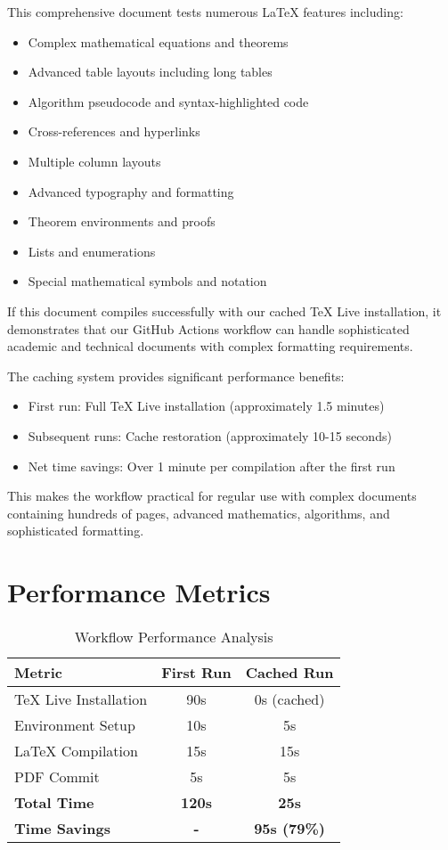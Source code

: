 \documentclass[12pt,a4paper,twoside]{article}
\theoremstyle{definition}
\begin{document}
This comprehensive document tests numerous LaTeX features including:
\begin{itemize}
\item Complex mathematical equations and theorems
\item Advanced table layouts including long tables
\item Algorithm pseudocode and syntax-highlighted code
\item Cross-references and hyperlinks
\item Multiple column layouts
\item Advanced typography and formatting
\item Theorem environments and proofs
\item Lists and enumerations
\item Special mathematical symbols and notation
\end{itemize}

If this document compiles successfully with our cached TeX Live installation, it demonstrates that our GitHub Actions workflow can handle sophisticated academic and technical documents with complex formatting requirements.

The caching system provides significant performance benefits:
\begin{itemize}
\item First run: Full TeX Live installation (approximately 1.5 minutes)
\item Subsequent runs: Cache restoration (approximately 10-15 seconds)
\item Net time savings: Over 1 minute per compilation after the first run
\end{itemize}

This makes the workflow practical for regular use with complex documents containing hundreds of pages, advanced mathematics, algorithms, and sophisticated formatting.

\appendix

\section{Performance Metrics}

\begin{table}[H]
\centering
\caption{Workflow Performance Analysis}
\begin{tabular}{@{}lcc@{}}
\toprule
\textbf{Metric} & \textbf{First Run} & \textbf{Cached Run} \\
\midrule
TeX Live Installation & 90s & 0s (cached) \\
Environment Setup & 10s & 5s \\
LaTeX Compilation & 15s & 15s \\
PDF Commit & 5s & 5s \\
\textbf{Total Time} & \textbf{120s} & \textbf{25s} \\
\textbf{Time Savings} & \textbf{-} & \textbf{95s (79\%)} \\
\bottomrule
\end{tabular}
\end{table}

\end{document}
